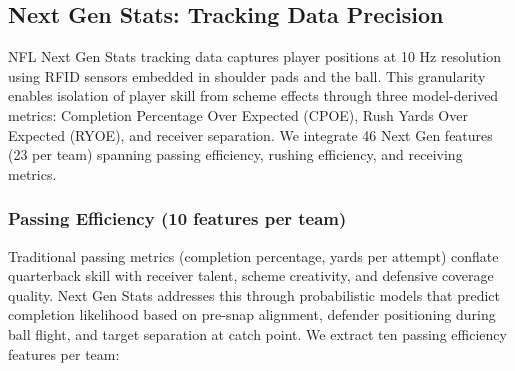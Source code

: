 \subsection{Next Gen Stats: Tracking Data Precision}
\label{subsec:nextgen-features}

NFL Next Gen Stats tracking data captures player positions at 10 Hz resolution using RFID sensors embedded in shoulder pads and the ball. This granularity enables isolation of player skill from scheme effects through three model-derived metrics: Completion Percentage Over Expected (CPOE), Rush Yards Over Expected (RYOE), and receiver separation. We integrate 46 Next Gen features (23 per team) spanning passing efficiency, rushing efficiency, and receiving metrics.

\subsubsection{Passing Efficiency (10 features per team)}

Traditional passing metrics (completion percentage, yards per attempt) conflate quarterback skill with receiver talent, scheme creativity, and defensive coverage quality. Next Gen Stats addresses this through probabilistic models that predict completion likelihood based on pre-snap alignment, defender positioning during ball flight, and target separation at catch point. We extract ten passing efficiency features per team:

